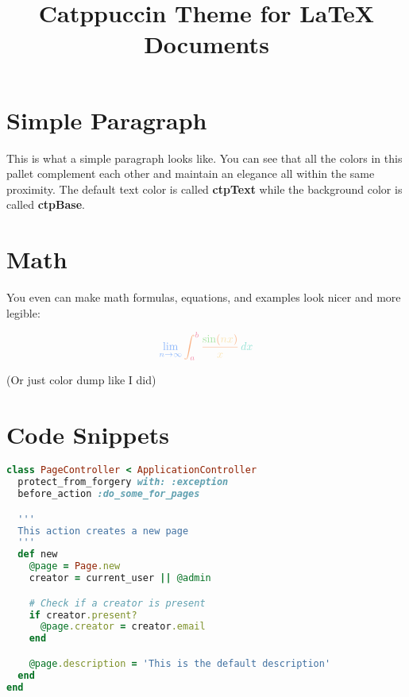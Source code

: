 \documentclass[12pt]{article}
\title{ \Huge \textbf{\textcolor{ctpPink}{Catppuccin Theme for} \newline \textcolor{ctpLavender}{\LaTeX{} Documents}} \vspace{-3em}}
\date{}
\begin{document}
\maketitle

\section{\textcolor{ctpSky}{Simple Paragraph}}
\textcolor{ctpYellow}{This is what a simple paragraph looks like.} You can see that all the colors in this pallet complement each other and maintain an elegance all within the same proximity. The default text color is called \textbf{\textcolor{ctpGreen}{ctpText}} while the background color is called \textbf{\textcolor{ctpGreen}{ctpBase}}.

\section{\textcolor{ctpSky}{Math}}

You even can make math formulas, equations, and examples look nicer and more legible:


\[\large{
    \textcolor{ctpBlue}{\lim_{{n \to \infty}} \textcolor{ctpPeach}{\int_{\textcolor{ctpRed}{a}}^{\textcolor{ctpRed}{b}} \frac{\textcolor{ctpGreen}{\sin}(\textcolor{ctpYellow}{nx})}{\textcolor{ctpYellow}{x}} \, \textcolor{ctpTeal}{dx}}}
}\]

\tiny{(Or just color dump like I did)}

\section{\textcolor{ctpSky}{Code Snippets}}

\begin{lstlisting}[language=Ruby,style=ruby_on_rails, caption={A ruby on rails code sample}]
class PageController < ApplicationController
  protect_from_forgery with: :exception
  before_action :do_some_for_pages

  '''
  This action creates a new page
  '''
  def new
    @page = Page.new
    creator = current_user || @admin

    # Check if a creator is present
    if creator.present?
      @page.creator = creator.email
    end

    @page.description = 'This is the default description'
  end
end
\end{lstlisting}
\end{document}
